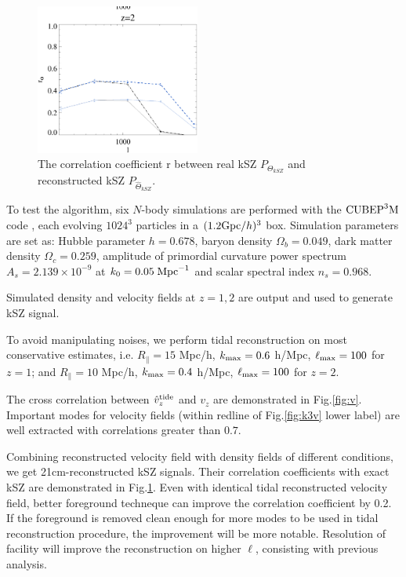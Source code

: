\begin{figure}[tbp]
\begin{center}
\includegraphics[width=0.48\textwidth]{figure/cl_correlation_z1_z2.eps}
\end{center}
\vspace{-0.7cm}
\caption{The correlation coefficient r between real kSZ $P_{\Theta_{kSZ}}$ 
and reconstructed kSZ $P_{\hat \Theta_{kSZ}}$.
}
\label{fig:r}
\end{figure}
\label{ssec:tide}

To test the algorithm, six $N$-body simulations are performed with the
$\mathrm{CUBEP}^3\mathrm{M}$ code \cite{2013:code}, each evolving $1024^3$ particles in a $(1.2\mathrm{Gpc}/h)^3$ box. 
Simulation parameters are set as: Hubble parameter $h=0.678$, baryon
density $\Omega_{b}=0.049$, dark matter density $\Omega_{c}=0.259$,
amplitude of primordial curvature power spectrum $A_s=2.139\times10^{-9}$ at 
$k_0=0.05\;\mathrm{Mpc}^{-1}$ and scalar spectral index $n_s=0.968$.

Simulated density and velocity fields at $z=1,2$ are output 
and used to generate kSZ signal. 


To avoid manipulating noises, 
we perform tidal reconstruction on most conservative estimates, i.e. 
$R_\parallel=15$ Mpc/h, $k_\mathrm{max}=0.6$ h/Mpc, $\ell_\mathrm{max}=100$ for $z=1$; 
and $R_\parallel=10$ Mpc/h, $k_\mathrm{max}=0.4$ h/Mpc, $\ell_\mathrm{max}=100$ for $z=2$. 

The cross correlation between $\hat v_z^\mathrm{tide}$ and $v_z$ are demonstrated in Fig.\ref{fig:v}. 
Important modes for velocity fields (within redline of Fig.\ref{fig:k3v} lower label) are well extracted with correlations greater than $0.7$. 

Combining reconstructed velocity field with density fields of different conditions, we get 21cm-reconstructed kSZ signals. 
Their correlation coefficients with exact kSZ are 
demonstrated in Fig.\ref{fig:r}. 
Even with identical tidal reconstructed velocity field, 
better foreground techneque can improve the correlation coefficient by 0.2. 
If the foreground is removed clean enough for more modes to be 
used in tidal reconstruction procedure, 
the improvement will be more notable.
Resolution of facility will improve the reconstruction on higher $\ell$, 
consisting with previous analysis.



